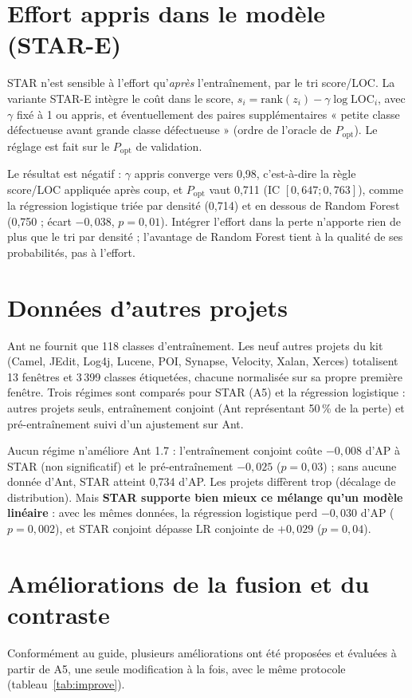 \documentclass[11pt,a4paper,openany]{report}
\begin{document}
\section{Effort appris dans le modèle (STAR-E)}
\label{sec:effort}
STAR n'est sensible à l'effort qu'\emph{après} l'entraînement, par le tri score/LOC. La variante STAR-E intègre le coût
dans le score, $s_i=\mathrm{rank}(z_i)-\gamma\log\mathrm{LOC}_i$, avec $\gamma$ fixé à 1 ou appris, et éventuellement
des paires supplémentaires « petite classe défectueuse avant grande classe défectueuse » (ordre de l'oracle de
$P_{\mathrm{opt}}$). Le réglage est fait sur le $P_{\mathrm{opt}}$ de validation.

Le résultat est négatif : $\gamma$ appris converge vers 0,98, c'est-à-dire la règle score/LOC appliquée après coup, et
$P_{\mathrm{opt}}$ vaut 0,711 (IC $[0{,}647;0{,}763]$), comme la régression logistique triée par densité (0,714) et en
dessous de Random Forest (0,750 ; écart $-0{,}038$, $p=0{,}01$). Intégrer l'effort dans la perte n'apporte rien de plus
que le tri par densité ; l'avantage de Random Forest tient à la qualité de ses probabilités, pas à l'effort.

\section{Données d'autres projets}
\label{sec:moredata}
Ant ne fournit que 118 classes d'entraînement. Les neuf autres projets du kit (Camel, JEdit, Log4j, Lucene, POI,
Synapse, Velocity, Xalan, Xerces) totalisent 13 fenêtres et 3\,399 classes étiquetées, chacune normalisée sur sa propre
première fenêtre. Trois régimes sont comparés pour STAR (A5) et la régression logistique : autres projets seuls,
entraînement conjoint (Ant représentant 50\,\% de la perte) et pré-entraînement suivi d'un ajustement sur Ant.

Aucun régime n'améliore Ant 1.7 : l'entraînement conjoint coûte $-0{,}008$ d'AP à STAR (non significatif) et le
pré-entraînement $-0{,}025$ ($p=0{,}03$) ; sans aucune donnée d'Ant, STAR atteint 0,734 d'AP. Les projets diffèrent trop
(décalage de distribution). Mais \textbf{STAR supporte bien mieux ce mélange qu'un modèle linéaire} : avec les mêmes
données, la régression logistique perd $-0{,}030$ d'AP ($p=0{,}002$), et STAR conjoint dépasse LR conjointe de
$+0{,}029$ ($p=0{,}04$).

\section{Améliorations de la fusion et du contraste}
\label{sec:improve}
Conformément au guide, plusieurs améliorations ont été proposées et évaluées à partir de A5, une seule modification à la
fois, avec le même protocole (tableau~\ref{tab:improve}).
\end{document}
